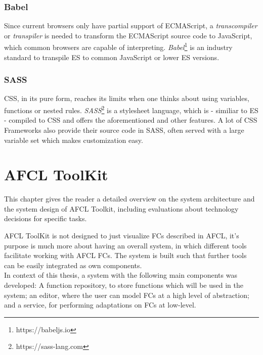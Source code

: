 \documentclass[a4paper,top=25mm,bottom=25mm,12pt,pdftex,halfparskip,twoside,openany,bibtotoc,numbers=noenddot]{scrbook}
\begin{document}
\subsection{Babel}
Since current browsers only have partial support of ECMAScript, a \textit{transcompiler} or \textit{transpiler} is needed to transform the ECMAScript source code to JavaScript, which common browsers are capable of interpreting.
\textit{Babel}\footnote{https://babeljs.io} is an industry standard to transpile ES to common JavaScript or lower ES versions.

\subsection{SASS}

CSS, in its pure form, reaches its limits when one thinks about using variables, functions or nested rules. \textit{SASS}\footnote{https://sass-lang.com} is a stylesheet language, which is - similiar to ES - compiled to CSS and offers the aforementioned and other features.
A lot of CSS Frameworks also provide their source code in SASS, often served with a large variable set which makes customization easy.

\chapter{AFCL ToolKit}
\label{chap:afcl-toolkit}

This chapter gives the reader a detailed overview on the system architecture and the system design of AFCL Toolkit, including evaluations about technology decisions for specific tasks.

AFCL ToolKit is not designed to just visualize FCs described in AFCL, it's purpose is much more about having an overall system, in which different tools facilitate working with AFCL FCs.
The system is built such that further tools can be easily integrated as own components.\\
In context of this thesis, a system with the following main components was developed: A function repository, to store functions which will be used in the system; an editor, where the user can model FCs at a high level of abstraction; and a service, for performing adaptations on FCs at low-level.


\end{document}
